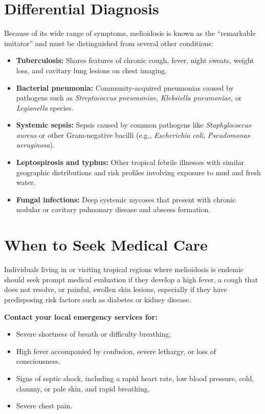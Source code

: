 \section*{Differential Diagnosis}
Because of its wide range of symptoms, melioidosis is known as the ``remarkable imitator'' and must be distinguished from several other conditions:
\begin{itemize}
    \item \textbf{Tuberculosis:} Shares features of chronic cough, fever, night sweats, weight loss, and cavitary lung lesions on chest imaging.
    \item \textbf{Bacterial pneumonia:} Community-acquired pneumonias caused by pathogens such as \textit{Streptococcus pneumoniae}, \textit{Klebsiella pneumoniae}, or \textit{Legionella} species.
    \item \textbf{Systemic sepsis:} Sepsis caused by common pathogens like \textit{Staphylococcus aureus} or other Gram-negative bacilli (e.g., \textit{Escherichia coli}, \textit{Pseudomonas aeruginosa}).
    \item \textbf{Leptospirosis and typhus:} Other tropical febrile illnesses with similar geographic distributions and risk profiles involving exposure to mud and fresh water.
    \item \textbf{Fungal infections:} Deep systemic mycoses that present with chronic nodular or cavitary pulmonary disease and abscess formation.
\end{itemize}

\section*{When to Seek Medical Care}
Individuals living in or visiting tropical regions where melioidosis is endemic should seek prompt medical evaluation if they develop a high fever, a cough that does not resolve, or painful, swollen skin lesions, especially if they have predisposing risk factors such as diabetes or kidney disease.

\textbf{Contact your local emergency services for:}
\begin{itemize}
    \item Severe shortness of breath or difficulty breathing.
    \item High fever accompanied by confusion, severe lethargy, or loss of consciousness.
    \item Signs of septic shock, including a rapid heart rate, low blood pressure, cold, clammy, or pale skin, and rapid breathing.
    \item Severe chest pain.
\end{itemize}


